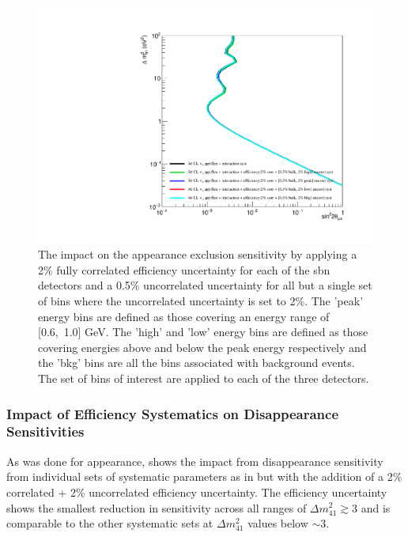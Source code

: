 \begin{figure}[h!]
    \centering
    \includegraphics[width = \largefigwidth]{figures-chap6/exclusion_contours/efficiency_systematics/nue_app_2pct_cor_05pct_bulk_2pct_X_uncor.pdf}
    \caption[\nue appearance with poorly constrained efficiency systematic for a set of bins.]{The impact on the \nue appearance exclusion sensitivity by applying a 2\% fully correlated efficiency uncertainty for each of the \gls{sbn} detectors and a 0.5\% uncorrelated uncertainty for all but a single set of bins where the uncorrelated uncertainty is set to 2\%. The 'peak' energy bins are defined as those covering an energy range of [0.6,~1.0] GeV. The 'high' and 'low' energy bins are defined as those covering energies above and below the peak energy respectively and the 'bkg' bins are all the bins associated with background events. The set of bins of interest are applied to each of the three detectors.}
    \label{fig:nue_app_bulk_uncertainty}
\end{figure}



\clearpage

\subsubsection*{\texorpdfstring{Impact of Efficiency Systematics on \nue Disappearance Sensitivities}{Impact of Efficiency Systematics on nue Disappearance Sensitivities}}

As was done for \nue appearance,  shows the impact from \nue disappearance sensitivity from individual sets of systematic parameters as in  but with the addition of a 2\% correlated + 2\% uncorrelated efficiency uncertainty. The efficiency uncertainty shows the smallest reduction in sensitivity across all ranges of $\Delta m_{41}^2 \gtrsim 3$ and is comparable to the other systematic sets at $\Delta m_{41}^2$ values below $\sim 3$.

